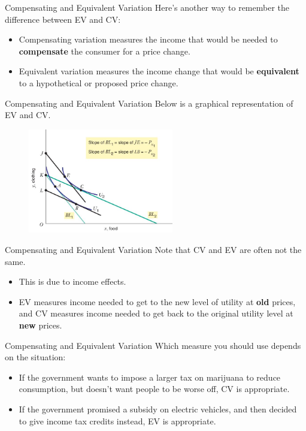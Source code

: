 \documentclass[11pt,t]{beamer}
\begin{document}
\begin{frame}{Compensating and Equivalent Variation}
  Here's another way to remember the difference between EV and CV:
  
  \bigskip
  \begin{itemize}
    \item Compensating variation measures the income that would be needed to \textbf{compensate} the consumer for a price change.

    \item Equivalent variation measures the income change that would be \textbf{equivalent} to a hypothetical or proposed price change.
  \end{itemize}
\end{frame}

\begin{frame}{Compensating and Equivalent Variation}
  Below is a graphical representation of EV and CV.
  \begin{figure}
    \includegraphics[width=240px]{figures/fig5_15.jpg}
  \end{figure}
\end{frame}


\begin{frame}{Compensating and Equivalent Variation}
  Note that CV and EV are often not the same.
  
  \bigskip
  \begin{itemize}
    \item This is due to income effects.

    \item EV measures income needed to get to the new level of utility at \textbf{old} prices, and CV measures income needed to get back to the original utility level at \textbf{new} prices.
  \end{itemize}
\end{frame}

\begin{frame}{Compensating and Equivalent Variation}
  Which measure you should use depends on the situation:

  \bigskip
  \begin{itemize}
    \item If the government wants to impose a larger tax on marijuana to reduce consumption, but doesn't want people to be worse off, CV is appropriate.

    \item If the government promised a subsidy on electric vehicles, and then decided to give income tax credits instead, EV is appropriate.
  \end{itemize}
\end{frame}
\end{document}
